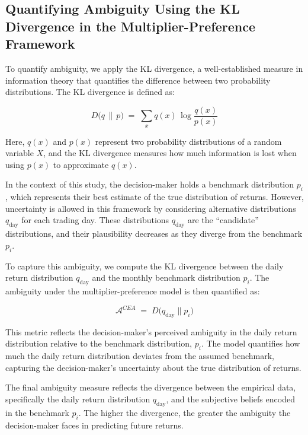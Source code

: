 \documentclass[preprint,12pt,authoryear]{elsarticle}
\begin{document}
\subsection{Quantifying Ambiguity Using the KL Divergence in the Multiplier-Preference Framework}

To quantify ambiguity, we apply the KL divergence, a well-established measure in information theory that quantifies the difference between two probability distributions. The KL divergence is defined as:

\begin{equation*}
D\bigl(q \,\|\, p\bigr) \;=\; \sum_{x} q(x)\,\log\!\frac{q(x)}{p(x)}
\end{equation*}

Here, \(q(x)\) and \(p(x)\) represent two probability distributions of a random variable \(X\), and the KL divergence measures how much information is lost when using \(p(x)\) to approximate \(q(x)\).

In the context of this study, the decision-maker holds a benchmark distribution \(p_i\), which represents their best estimate of the true distribution of returns. However, uncertainty is allowed in this framework by considering alternative distributions \(q_{\text{day}}\) for each trading day. These distributions \(q_{\text{day}}\) are the ``candidate'' distributions, and their plausibility decreases as they diverge from the benchmark \(p_i\).

To capture this ambiguity, we compute the KL divergence between the daily return distribution \(q_{\text{day}}\) and the monthly benchmark distribution \(p_i\). The ambiguity under the multiplier-preference model is then quantified as:

\begin{equation*}
\mathcal{A}^{CEA} \;=\; D\bigl(q_{\mathrm{day}} \parallel p_i\bigr)
\end{equation*}

This metric reflects the decision-maker's perceived ambiguity in the daily return distribution relative to the benchmark distribution, \(p_i\). The model quantifies how much the daily return distribution deviates from the assumed benchmark, capturing the decision-maker's uncertainty about the true distribution of returns.

The final ambiguity measure reflects the divergence between the empirical data, specifically the daily return distribution \(q_{\text{day}}\), and the subjective beliefs encoded in the benchmark \(p_i\). The higher the divergence, the greater the ambiguity the decision-maker faces in predicting future returns.
\end{document}
